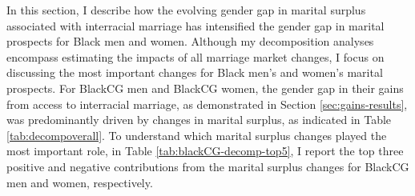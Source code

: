 In this section, I describe how the evolving gender gap in marital surplus associated with interracial marriage has intensified the gender gap in marital prospects for Black men and women. Although my decomposition analyses encompass estimating the impacts of all marriage market changes, I focus on discussing the most important changes for Black men's and women's marital prospects.  For BlackCG men and BlackCG women, the gender gap in their gains from access to interracial marriage, as demonstrated in Section \ref{sec:gains-results}, was predominantly driven by changes in marital surplus, as indicated in Table \ref{tab:decompoverall}. To understand which marital surplus changes played the most important role, in Table \ref{tab:blackCG-decomp-top5}, I report the top three positive and negative contributions from the marital surplus changes for BlackCG men and women, respectively. 



